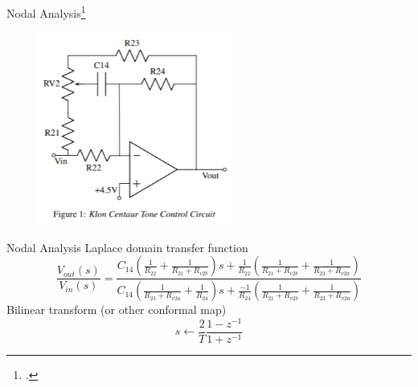 \begin{frame}
\end{frame}

\begin{frame}{Nodal Analysis\footcite{pasp,Maby}}
    \begin{figure}
        \centering
        \includegraphics[height=2.5in]{Figures/ToneControl.png}
    \end{figure}
\end{frame}

\begin{frame}{Nodal Analysis}
    Laplace domain transfer function
    \begin{equation}
        \frac{V_{out}(s)}{V_{in}(s)} = {\scriptscriptstyle \frac{C_{14}\left(\frac{1}{R_{22}} + \frac{1}{R_{21} + R_{v2b}}\right)s
        + \frac{1}{R_{22}}\left(\frac{1}{R_{21} + R_{v2b}} + \frac{1}{R_{23} + R_{v2a}}\right)}{
          C_{14}\left(\frac{1}{R_{23} + R_{v2a}} + \frac{1}{R_{24}}\right)s
        + \frac{-1}{R_{24}}\left(\frac{1}{R_{21} + R_{v2b}} + \frac{1}{R_{23} + R_{v2a}}\right)}}
    \end{equation}
    Bilinear transform (or other conformal map)
    \begin{equation}
        s \leftarrow \frac{2}{T} \frac{1 - z^{-1}}{1 + z^{-1}}
    \end{equation}
\end{frame}

